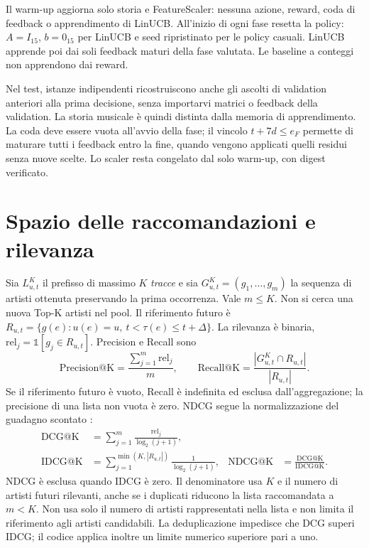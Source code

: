 Il warm-up aggiorna solo storia e FeatureScaler: nessuna azione, reward, coda di feedback o apprendimento di LinUCB. All'inizio di ogni fase  resetta la policy: $A=I_{15}$, $b=0_{15}$ per LinUCB e seed ripristinato per le policy casuali. LinUCB apprende poi dai soli feedback maturi della fase valutata. Le baseline a conteggi non apprendono dai reward.

Nel test, istanze indipendenti ricostruiscono anche gli ascolti di validation anteriori alla prima decisione, senza importarvi matrici o feedback della validation. La storia musicale è quindi distinta dalla memoria di apprendimento. La coda deve essere vuota all'avvio della fase; il vincolo $t+7d\leq e_F$ permette di maturare tutti i feedback entro la fine, quando vengono applicati quelli residui senza nuove scelte. Lo scaler resta congelato dal solo warm-up, con digest verificato.

\section{Spazio delle raccomandazioni e rilevanza}
Sia $L^K_{u,t}$ il prefisso di massimo $K$ \emph{tracce} e sia $G^K_{u,t}=(g_1,\ldots,g_m)$ la sequenza di artisti ottenuta preservando la prima occorrenza. Vale $m\leq K$. Non si cerca una nuova Top-K artisti nel pool. Il riferimento futuro è $R_{u,t}=\{g(e):u(e)=u,\ t<\tau(e)\leq t+\Delta\}$.
La rilevanza è binaria, $\mathrm{rel}_j=\mathbb1[g_j\in R_{u,t}]$. Precision e Recall sono
\begin{equation}
\mathrm{Precision@K}=\frac{\sum_{j=1}^m\mathrm{rel}_j}{m},
\qquad
\mathrm{Recall@K}=\frac{|G^K_{u,t}\cap R_{u,t}|}{|R_{u,t}|}.
\end{equation}
Se il riferimento futuro è vuoto, Recall è indefinita ed esclusa dall'aggregazione; la precisione di una lista non vuota è zero. NDCG segue la normalizzazione del guadagno scontato \cite{jarvelin2002}:
\begin{align}
\mathrm{DCG@K}&=\sum_{j=1}^{m}\frac{\mathrm{rel}_j}{\log_2(j+1)},\\
\mathrm{IDCG@K}&=\sum_{j=1}^{\min(K,|R_{u,t}|)}\frac1{\log_2(j+1)},
&\mathrm{NDCG@K}&=\frac{\mathrm{DCG@K}}{\mathrm{IDCG@K}}.\label{eq:ndcg}
\end{align}
NDCG è esclusa quando IDCG è zero. Il denominatore usa $K$ e il numero di artisti futuri rilevanti, anche se i duplicati riducono la lista raccomandata a $m<K$. Non usa solo il numero di artisti rappresentati nella lista e non limita il riferimento agli artisti candidabili. La deduplicazione impedisce che DCG superi IDCG; il codice applica inoltre un limite numerico superiore pari a uno.

